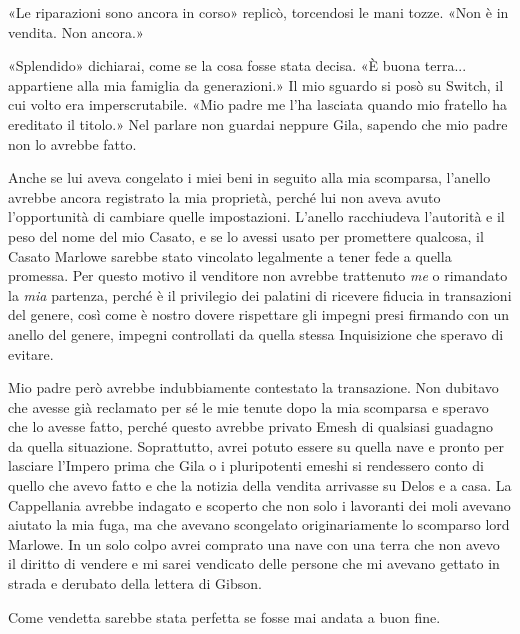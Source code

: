 «Le riparazioni sono ancora in corso» replicò, torcendosi le mani tozze.
«Non è in vendita. Non ancora.»

«Splendido» dichiarai, come se la cosa fosse stata decisa. «È buona
terra... appartiene alla mia famiglia da generazioni.» Il mio sguardo si
posò su Switch, il cui volto era imperscrutabile. «Mio padre me l'ha
lasciata quando mio fratello ha ereditato il titolo.» Nel parlare non
guardai neppure Gila, sapendo che mio padre non lo avrebbe fatto.

Anche se lui aveva congelato i miei beni in seguito alla mia scomparsa,
l'anello avrebbe ancora registrato la mia proprietà, perché lui non
aveva avuto l'opportunità di cambiare quelle impostazioni. L'anello
racchiudeva l'autorità e il peso del nome del mio Casato, e se lo avessi
usato per promettere qualcosa, il Casato Marlowe sarebbe stato vincolato
legalmente a tener fede a quella promessa. Per questo motivo il
venditore non avrebbe trattenuto \emph{me} o rimandato la \emph{mia}
partenza, perché è il privilegio dei palatini di ricevere fiducia in
transazioni del genere, così come è nostro dovere rispettare gli impegni
presi firmando con un anello del genere, impegni controllati da quella
stessa Inquisizione che speravo di evitare.

Mio padre però avrebbe indubbiamente contestato la transazione. Non
dubitavo che avesse già reclamato per sé le mie tenute dopo la mia
scomparsa e speravo che lo avesse fatto, perché questo avrebbe privato
Emesh di qualsiasi guadagno da quella situazione. Soprattutto, avrei
potuto essere su quella nave e pronto per lasciare l'Impero prima che
Gila o i pluripotenti emeshi si rendessero conto di quello che avevo
fatto e che la notizia della vendita arrivasse su Delos e a casa. La
Cappellania avrebbe indagato e scoperto che non solo i lavoranti dei
moli avevano aiutato la mia fuga, ma che avevano scongelato
originariamente lo scomparso lord Marlowe. In un solo colpo avrei
comprato una nave con una terra che non avevo il diritto di vendere e mi
sarei vendicato delle persone che mi avevano gettato in strada e
derubato della lettera di Gibson.

Come vendetta sarebbe stata perfetta se fosse mai andata a buon fine.


